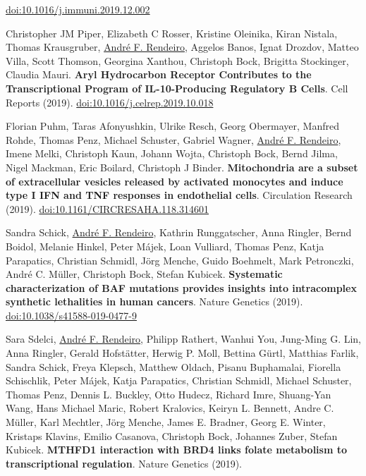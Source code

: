 \documentclass[11pt,a4paper,roman]{moderncv} %
\begin{document}
\begin{etaremune}[leftmargin=1.0cm, itemindent=0pt, topsep=10pt, itemsep=2pt, partopsep=0pt, parsep=0pt]
        \href{https://dx.doi.org/doi:10.1016/j.immuni.2019.12.002}{doi:10.1016/j.immuni.2019.12.002}
        \item Christopher JM Piper, Elizabeth C Rosser, Kristine Oleinika, Kiran Nistala, Thomas Krausgruber, \underline{André F. Rendeiro}, Aggelos Banos, Ignat Drozdov, Matteo Villa, Scott Thomson, Georgina Xanthou, Christoph Bock, Brigitta Stockinger, Claudia Mauri. \textbf{Aryl Hydrocarbon Receptor Contributes to the Transcriptional Program of IL-10-Producing Regulatory B Cells}. Cell Reports (2019).
        \href{https://dx.doi.org/10.1016/j.celrep.2019.10.018}{doi:10.1016/j.celrep.2019.10.018}
        \item Florian Puhm, Taras Afonyushkin, Ulrike Resch, Georg Obermayer, Manfred Rohde, Thomas Penz, Michael Schuster, Gabriel Wagner, \underline{André F. Rendeiro}, Imene Melki, Christoph Kaun, Johann Wojta, Christoph Bock, Bernd Jilma, Nigel Mackman, Eric Boilard, Christoph J Binder. \textbf{Mitochondria are a subset of extracellular vesicles released by activated monocytes and induce type I IFN and TNF responses in endothelial cells}. Circulation Research (2019).
        \href{https://dx.doi.org/10.1161/CIRCRESAHA.118.314601}{doi:10.1161/CIRCRESAHA.118.314601}
        \item Sandra Schick, \underline{André F. Rendeiro}, Kathrin Runggatscher, Anna Ringler, Bernd Boidol, Melanie Hinkel, Peter Májek, Loan Vulliard, Thomas Penz, Katja Parapatics, Christian Schmidl, Jörg Menche, Guido Boehmelt, Mark Petronczki, André C. Müller, Christoph Bock, Stefan Kubicek. \textbf{Systematic characterization of BAF mutations provides insights into intracomplex synthetic lethalities in human cancers}. Nature Genetics (2019).
        \href{https://dx.doi.org/10.1038/s41588-019-0477-9}{doi:10.1038/s41588-019-0477-9}
        \item Sara Sdelci, \underline{André F. Rendeiro}, Philipp Rathert, Wanhui You, Jung-Ming G. Lin, Anna Ringler, Gerald Hofstätter, Herwig P. Moll, Bettina Gürtl, Matthias Farlik, Sandra Schick, Freya Klepsch, Matthew Oldach, Pisanu Buphamalai, Fiorella Schischlik, Peter Májek, Katja Parapatics, Christian Schmidl, Michael Schuster, Thomas Penz, Dennis L. Buckley, Otto Hudecz, Richard Imre, Shuang-Yan Wang, Hans Michael Maric, Robert Kralovics, Keiryn L. Bennett, Andre C. Müller, Karl Mechtler, Jörg Menche, James E. Bradner, Georg E. Winter, Kristaps Klavins, Emilio Casanova, Christoph Bock, Johannes Zuber, Stefan Kubicek. \textbf{MTHFD1 interaction with BRD4 links folate metabolism to transcriptional regulation}. Nature Genetics (2019).

\end{etaremune}
\end{document}
